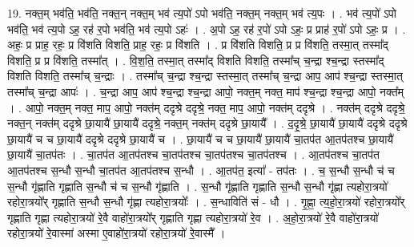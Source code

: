 \documentclass[17pt]{extarticle}
\begin{document}
19. नक्त॒म् भव॑ति॒ भव॑ति॒ नक्त॒न् नक्त॒म् भव॑ त्य॒पो॑ ऽपो भव॑ति॒ नक्त॒म् नक्त॒म् भव॑ त्य॒पः । . भव॑ त्य॒पो॑ ऽपो भव॑ति॒ भव॑ त्य॒पो ऽह॒ रह॑ र॒पो भव॑ति॒ भव॑ त्य॒पो ऽहः॑ । . अ॒पो ऽह॒ रह॑ र॒पो॑ ऽपो ऽहः॒ प्र प्राह॑ र॒पो॑ ऽपो ऽहः॒ प्र । . अहः॒ प्र प्राह॒ रहः॒ प्र वि॑शति विशति॒ प्राह॒ रहः॒ प्र वि॑शति । . प्र वि॑शति विशति॒ प्र प्र वि॑शति॒ तस्मा॒त् तस्मा᳚द् विशति॒ प्र प्र वि॑शति॒ तस्मा᳚त् । . वि॒श॒ति॒ तस्मा॒त् तस्मा᳚द् विशति विशति॒ तस्मा᳚च् च॒न्द्रा श्च॒न्द्रा स्तस्मा᳚द् विशति विशति॒ तस्मा᳚च् च॒न्द्राः । . तस्मा᳚च् च॒न्द्रा श्च॒न्द्रा स्तस्मा॒त् तस्मा᳚च् च॒न्द्रा आप॒ आप॑ श्च॒न्द्रा स्तस्मा॒त् तस्मा᳚च् च॒न्द्रा आपः॑ । . च॒न्द्रा आप॒ आप॑ श्च॒न्द्रा श्च॒न्द्रा आपो॒ नक्त॒म् नक्त॒ माप॑ श्च॒न्द्रा श्च॒न्द्रा आपो॒ नक्त᳚म् । . आपो॒ नक्त॒म् नक्त॒ माप॒ आपो॒ नक्त॑म् ददृश्रे ददृश्रे॒ नक्त॒ माप॒ आपो॒ नक्त॑म् ददृश्रे । . नक्त॑म् ददृश्रे ददृश्रे॒ नक्त॒न् नक्त॑म् ददृश्रे छा॒यायै॑ छा॒यायै॑ ददृश्रे॒ नक्त॒म् नक्त॑म् ददृश्रे छा॒यायै᳚ । . द॒दृ॒श्रे॒ छा॒यायै॑ छा॒यायै॑ ददृश्रे ददृश्रे छा॒यायै॑ च च छा॒यायै॑ ददृश्रे ददृश्रे छा॒यायै॑ च । . छा॒यायै॑ च च छा॒यायै॑ छा॒यायै॑ चा॒तप॑त आ॒तप॑तश्च छा॒यायै॑ छा॒यायै॑ चा॒तप॑तः । . चा॒तप॑त आ॒तप॑तश्च चा॒तप॑तश्च चा॒तप॑तश्च चा॒तप॑तश्च । . आ॒तप॑तश्च चा॒तप॑त आ॒तप॑तश्च स॒न्धौ स॒न्धौ चा॒तप॑त आ॒तप॑तश्च स॒न्धौ । . आ॒तप॑त॒ इत्या᳚ - तप॑तः । . च॒ स॒न्धौ स॒न्धौ च॑ च स॒न्धौ गृ॑ह्णाति गृह्णाति स॒न्धौ च॑ च स॒न्धौ गृ॑ह्णाति । . स॒न्धौ गृ॑ह्णाति गृह्णाति स॒न्धौ स॒न्धौ गृ॑ह्णा त्यहोरा॒त्रयो॑ रहोरा॒त्रयो᳚र् गृह्णाति स॒न्धौ स॒न्धौ गृ॑ह्णा त्यहोरा॒त्रयोः᳚ । . स॒न्धाविति॑ सं - धौ । . गृ॒ह्णा॒ त्य॒हो॒रा॒त्रयो॑ रहोरा॒त्रयो᳚र् गृह्णाति गृह्णा त्यहोरा॒त्रयो॑ रे॒वै वाहो॑रा॒त्रयो᳚र् गृह्णाति गृह्णा त्यहोरा॒त्रयो॑ रे॒व । . अ॒हो॒रा॒त्रयो॑ रे॒वै वाहो॑रा॒त्रयो॑ रहोरा॒त्रयो॑ रे॒वास्मा॑ अस्मा ए॒वाहो॑रा॒त्रयो॑ रहोरा॒त्रयो॑ रे॒वास्मै᳚ । \newline
\end{document}
